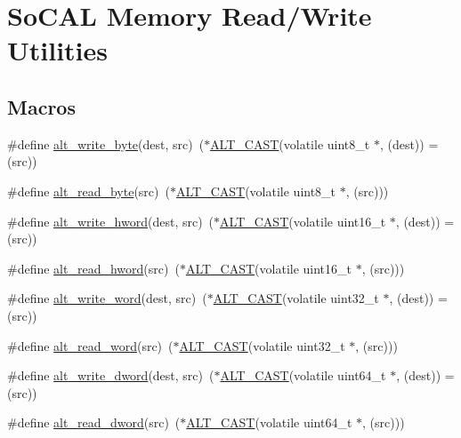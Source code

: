 \hypertarget{group__ALT__SOCAL__UTIL__RW__FUNC}{}\section{So\+C\+AL Memory Read/\+Write Utilities}
\label{group__ALT__SOCAL__UTIL__RW__FUNC}
\subsection*{Macros}
\begin{DoxyCompactItemize}
\item 
\#define \mbox{\hyperlink{group__ALT__SOCAL__UTIL__RW__FUNC_ga48f504d9c370e45073a9c5e142e1036d}{alt\+\_\+write\+\_\+byte}}(dest,  src)~($\ast$\mbox{\hyperlink{group__ALT__SOCAL__UTIL_ga0c0d803769fc22ce2c319fc475febbde}{A\+L\+T\+\_\+\+C\+A\+ST}}(volatile uint8\+\_\+t $\ast$, (dest)) = (src))
\item 
\#define \mbox{\hyperlink{group__ALT__SOCAL__UTIL__RW__FUNC_ga1bf0798969c891f5885170ff2de3ac88}{alt\+\_\+read\+\_\+byte}}(src)~($\ast$\mbox{\hyperlink{group__ALT__SOCAL__UTIL_ga0c0d803769fc22ce2c319fc475febbde}{A\+L\+T\+\_\+\+C\+A\+ST}}(volatile uint8\+\_\+t $\ast$, (src)))
\item 
\#define \mbox{\hyperlink{group__ALT__SOCAL__UTIL__RW__FUNC_ga68370263143f2bbcae44530837772f50}{alt\+\_\+write\+\_\+hword}}(dest,  src)~($\ast$\mbox{\hyperlink{group__ALT__SOCAL__UTIL_ga0c0d803769fc22ce2c319fc475febbde}{A\+L\+T\+\_\+\+C\+A\+ST}}(volatile uint16\+\_\+t $\ast$, (dest)) = (src))
\item 
\#define \mbox{\hyperlink{group__ALT__SOCAL__UTIL__RW__FUNC_gaae69946769b67a9b8bf4f57143b1c4d7}{alt\+\_\+read\+\_\+hword}}(src)~($\ast$\mbox{\hyperlink{group__ALT__SOCAL__UTIL_ga0c0d803769fc22ce2c319fc475febbde}{A\+L\+T\+\_\+\+C\+A\+ST}}(volatile uint16\+\_\+t $\ast$, (src)))
\item 
\#define \mbox{\hyperlink{group__ALT__SOCAL__UTIL__RW__FUNC_gac135ea12921af3aeb033c92ddb82c66c}{alt\+\_\+write\+\_\+word}}(dest,  src)~($\ast$\mbox{\hyperlink{group__ALT__SOCAL__UTIL_ga0c0d803769fc22ce2c319fc475febbde}{A\+L\+T\+\_\+\+C\+A\+ST}}(volatile uint32\+\_\+t $\ast$, (dest)) = (src))
\item 
\#define \mbox{\hyperlink{group__ALT__SOCAL__UTIL__RW__FUNC_ga77db76edef8b90adb75eb837325b5d11}{alt\+\_\+read\+\_\+word}}(src)~($\ast$\mbox{\hyperlink{group__ALT__SOCAL__UTIL_ga0c0d803769fc22ce2c319fc475febbde}{A\+L\+T\+\_\+\+C\+A\+ST}}(volatile uint32\+\_\+t $\ast$, (src)))
\item 
\#define \mbox{\hyperlink{group__ALT__SOCAL__UTIL__RW__FUNC_ga0fe80f8e5b6f3f09976dd35df49285e7}{alt\+\_\+write\+\_\+dword}}(dest,  src)~($\ast$\mbox{\hyperlink{group__ALT__SOCAL__UTIL_ga0c0d803769fc22ce2c319fc475febbde}{A\+L\+T\+\_\+\+C\+A\+ST}}(volatile uint64\+\_\+t $\ast$, (dest)) = (src))
\item 
\#define \mbox{\hyperlink{group__ALT__SOCAL__UTIL__RW__FUNC_gad66f5bf6cf73c5ba348a7ab118bcd2a0}{alt\+\_\+read\+\_\+dword}}(src)~($\ast$\mbox{\hyperlink{group__ALT__SOCAL__UTIL_ga0c0d803769fc22ce2c319fc475febbde}{A\+L\+T\+\_\+\+C\+A\+ST}}(volatile uint64\+\_\+t $\ast$, (src)))
\end{DoxyCompactItemize}


